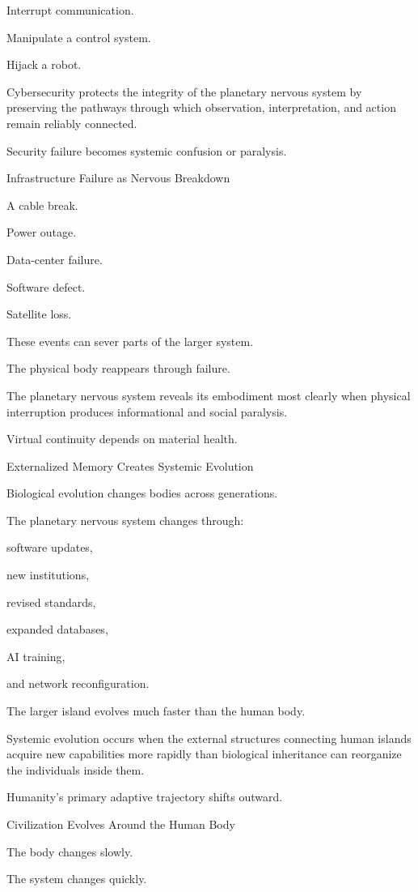 Interrupt communication.

Manipulate a control system.

Hijack a robot.

Cybersecurity protects the integrity of the planetary nervous system by preserving the pathways through which observation, interpretation, and action remain reliably connected.

Security failure becomes systemic confusion or paralysis.

Infrastructure Failure as Nervous Breakdown

A cable break.

Power outage.

Data-center failure.

Software defect.

Satellite loss.

These events can sever parts of the larger system.

The physical body reappears through failure.

The planetary nervous system reveals its embodiment most clearly when physical interruption produces informational and social paralysis.

Virtual continuity depends on material health.

Externalized Memory Creates Systemic Evolution

Biological evolution changes bodies across generations.

The planetary nervous system changes through:

software updates,

new institutions,

revised standards,

expanded databases,

AI training,

and network reconfiguration.

The larger island evolves much faster than the human body.

Systemic evolution occurs when the external structures connecting human islands acquire new capabilities more rapidly than biological inheritance can reorganize the individuals inside them.

Humanity’s primary adaptive trajectory shifts outward.

Civilization Evolves Around the Human Body

The body changes slowly.

The system changes quickly.

